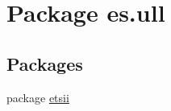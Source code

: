 \hypertarget{namespacees_1_1ull}{\section{Package es.\-ull}
\label{namespacees_1_1ull}
}
\subsection*{Packages}
\begin{DoxyCompactItemize}
\item 
package \hyperlink{namespacees_1_1ull_1_1etsii}{etsii}
\end{DoxyCompactItemize}
